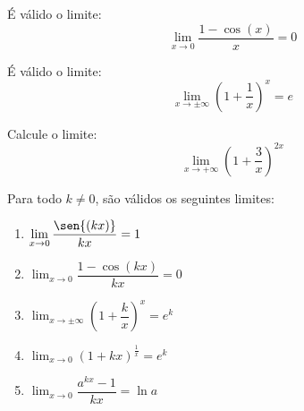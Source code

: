 \begin{frame}
  \begin{theorem}
    É válido o limite:
    \begin{equation*}
      \lim_{x\to 0} \dfrac{1-\cos{(x)}}{x} = 0
    \end{equation*}
  \end{theorem}
\end{frame}

\begin{frame}
  \begin{theorem}
    É válido o limite:
    \begin{equation*}
      \lim_{x\to \pm \infty} {\left(1+\dfrac{1}{x}\right)}^x=e
    \end{equation*}
  \end{theorem}
  \begin{figure}\vspace*{-0.5cm}
  \end{figure}
\end{frame}

\begin{frame}
  \begin{example}
    Calcule o limite:
    \begin{equation*}
      \displaystyle\lim_{x\to +\infty} {\left(1+\dfrac{3}{x}\right)}^{2x}
    \end{equation*}
  \end{example}
\end{frame}

\begin{frame}
  \begin{theorem}[\phantom{ç}]
    Para todo $k\neq 0$, são válidos os seguintes limites:
    \begin{enumerate}
      \item $\displaystyle\lim_{x\to 0}\dfrac{\sen{(kx)}}{kx}=1$
      \item $\displaystyle\lim_{x\to 0}\dfrac{1-\cos{(kx)}}{kx}=0$
      \item $\displaystyle\lim_{x\to \pm \infty} {\left(1+\dfrac{k}{x}\right)}^{x}=e^k$
      \item $\displaystyle\lim_{x\to 0} {(1+kx)}^{\frac{1}{x}}=e^{k}$
      \item $\displaystyle\lim_{x\to 0} \dfrac{a^{kx}-1}{kx}=\ln{a}$
    \end{enumerate}
  \end{theorem}
\end{frame}

